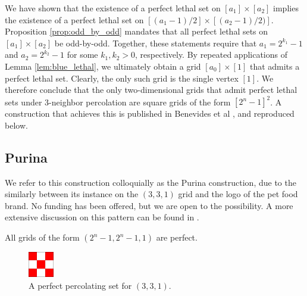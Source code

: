 We have shown that the existence of a perfect lethal set on $[a_1] \times [a_2]$ implies the existence of a perfect lethal set on $[(a_1-1)/2] \times [(a_2-1)/2)]$. Proposition \ref{prop:odd_by_odd} mandates that all perfect lethal sets on $[a_1] \times [a_2]$ be odd-by-odd. Together, these statements require that $a_1 = 2^{k_1}-1$ and $a_2 = 2^{k_2}-1$ for some $k_1,k_2 > 0$, respectively. By repeated applications of Lemma \ref{lem:blue_lethal}, we ultimately obtain a grid $[a_0] \times [1]$ that admits a perfect lethal set. Clearly, the only such grid is the single vertex $[1]$. We therefore conclude that the only two-dimensional grids that admit perfect lethal sets under 3-neighbor percolation are square grids of the form $[2^n-1]^2$. A construction that achieves this is published in Benevides et al \cite{benevides}, and reproduced below.

\subsection{Purina}

We refer to this construction colloquially as the Purina construction, due to the similarly between its instance on the $(3,3,1)$ grid and the logo of the pet food brand. No funding has been offered, but we are open to the possibility. A more extensive discussion on this pattern can be found in \cite{benevides:2021}.

\begin{con}
\label{con:purina}
All grids of the form $(2^n-1, 2^n-1, 1)$ are perfect.
\end{con}

\begin{figure}[]
\centering
\includegraphics[width=0.1\textwidth]{figures/7/3x3x1.pdf}
\caption{A perfect percolating set for $(3,3,1)$.}
\label{fig:3x3x1}
\end{figure} 

